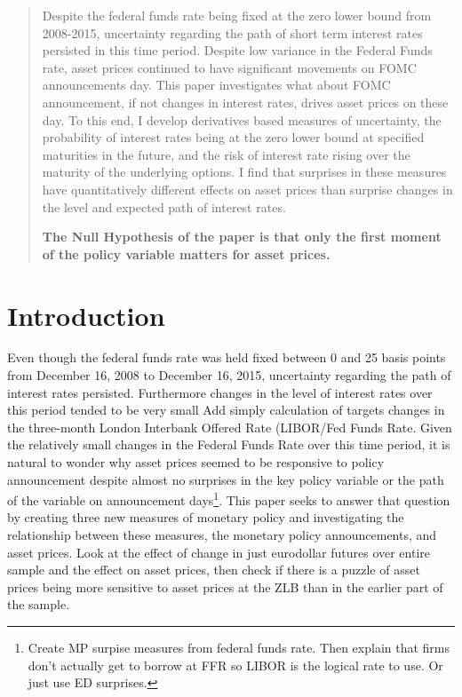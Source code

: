 \documentclass[11pt]{article}
\begin{document}
\maketitle

\begin{abstract}
Despite the federal funds rate being fixed at the zero lower bound from 2008-2015, uncertainty regarding the path of short term interest rates persisted in this time period. Despite low variance in the Federal Funds rate, asset prices continued to have significant movements on FOMC announcements day. This paper investigates what about FOMC announcement, if not changes in interest rates, drives asset prices on these day. To this end, I develop derivatives based measures of uncertainty, the probability of interest rates being at the zero lower bound at specified maturities in the future, and the risk of interest rate rising over the maturity of the underlying options. I find that surprises in these measures have quantitatively different effects on asset prices than surprise changes in the level and expected path of interest rates. 

\textbf{The Null Hypothesis of the paper is that only the first moment of the policy variable matters for asset prices. }


 
\end{abstract}

\section{Introduction}
\doublespacing

Even though the federal funds rate was held fixed between 0 and 25 basis points from December 16, 2008 to December 16, 2015, uncertainty regarding the path of interest rates persisted. Furthermore changes in the level of interest rates over this period tended to be very small {\color{red} Add simply calculation of targets changes in the three-month London Interbank Offered Rate (LIBOR/Fed Funds Rate}. Given the relatively small changes in the Federal Funds Rate over this time period, it is natural to wonder why asset prices seemed to be responsive to policy announcement despite almost no surprises in the key policy variable or the path of the variable on announcement days\footnote{Create MP surpise measures from federal funds rate. Then explain that firms don't actually get to borrow at FFR so LIBOR is the logical rate to use. Or just use ED surprises.}. This paper seeks to answer that question by creating three new measures of monetary policy and investigating the relationship between these measures, the monetary policy announcements, and asset prices. {\color{red} Look at the effect of change in just eurodollar futures over entire sample and the effect on asset prices, then check if there is a puzzle of asset prices being more sensitive to asset prices at the ZLB than in the earlier part of the sample.}
\end{document}
